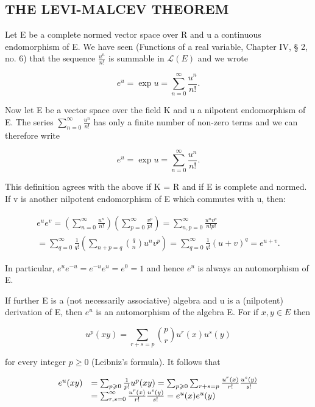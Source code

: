 \subsection{THE LEVI-MALCEV THEOREM}

Let E be a complete normed vector space over R and u a continuous endomorphism of E. We have seen (Functions of a real variable, Chapter IV, § 2, no. 6) that the sequence \(\frac{u^{n}}{n!}\) is summable in \(\mathcal{L}(E)\) and we wrote

\[
e ^ {u} = \exp u = \sum_ {n = 0} ^ {\infty} \frac {u ^ {n}}{n !}.
\]

Now let E be a vector space over the field K and u a nilpotent endomorphism of E. The series \(\sum_{n=0}^{\infty}\frac{u^{n}}{n!}\) has only a finite number of non-zero terms and we can therefore write

\[
e ^ {u} = \exp u = \sum_ {n = 0} ^ {\infty} \frac {u ^ {n}}{n !}.
\]

This definition agrees with the above if K = R and if E is complete and normed. If v is another nilpotent endomorphism of E which commutes with u, then:

\[
\begin{array}{l} e ^ {u} e ^ {v} = \left(\sum_ {n = 0} ^ {\infty} \frac {u ^ {n}}{n !}\right) \left(\sum_ {p = 0} ^ {\infty} \frac {v ^ {p}}{p !}\right) = \sum_ {n, p = 0} ^ {\infty} \frac {u ^ {n} v ^ {p}}{n ! p !} \\ = \sum_ {q = 0} ^ {\infty} \frac {1}{q !} \left(\sum_ {n + p = q} \binom {q} {n} u ^ {n} v ^ {p}\right) = \sum_ {q = 0} ^ {\infty} \frac {1}{q !} (u + v) ^ {q} = e ^ {u + v}. \end{array}\tag{3}
\]

In particular, \(e^u e^{-u} = e^{-u}e^u = e^0 = 1\) and hence \(e^u\) is always an automorphism of E.

If further E is a (not necessarily associative) algebra and u is a (nilpotent) derivation of E, then \(e^{u}\) is an automorphism of the algebra E. For if \(x, y \in E\) then

\[
u ^ {p} (x y) = \sum_ {r + s = p} \binom {p} {r} u ^ {r} (x) u ^ {s} (y)
\]

for every integer \(p \geqslant 0\) (Leibniz's formula). It follows that

\[
\begin{array}{r l} e ^ {u} (x y) & = \sum_ {p \geqslant 0} \frac {1}{p !} u ^ {p} (x y) = \sum_ {p \geqslant 0} \sum_ {r + s = p} \frac {u ^ {r} (x)}{r !} \frac {u ^ {s} (y)}{s !} \\ & = \sum_ {r, s = 0} ^ {\infty} \frac {u ^ {r} (x)}{r !} \frac {u ^ {s} (y)}{s !} = e ^ {u} (x) e ^ {u} (y) \end{array}
\]

